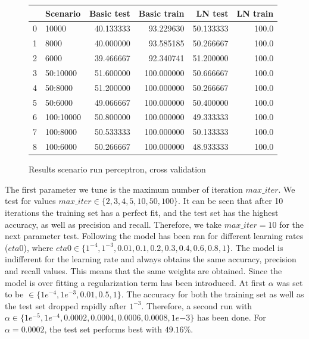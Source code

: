 \documentclass[11pt]{article}
\begin{document}
\begin{figure} 
\begin{tabular}{llrrrr}
\toprule
{} &   Scenario &  Basic test &  Basic train &    LN test &  LN train \\
\midrule
0 &      10000 &   40.133333 &    93.229630 &  50.133333 &     100.0 \\
1 &       8000 &   40.000000 &    93.585185 &  50.266667 &     100.0 \\
2 &       6000 &   39.466667 &    92.340741 &  51.200000 &     100.0 \\
3 &   50:10000 &   51.600000 &   100.000000 &  50.666667 &     100.0 \\
4 &    50:8000 &   51.200000 &   100.000000 &  50.266667 &     100.0 \\
5 &    50:6000 &   49.066667 &   100.000000 &  50.400000 &     100.0 \\
6 &  100:10000 &   50.800000 &   100.000000 &  49.333333 &     100.0 \\
7 &   100:8000 &   50.533333 &   100.000000 &  50.133333 &     100.0 \\
8 &   100:6000 &   50.266667 &   100.000000 &  48.933333 &     100.0 \\
\bottomrule
\end{tabular}
\caption{Results scenario run perceptron, cross validation}
\label{tab:Accuracy perceptron cross validation}
\end{figure}
%
The first parameter we tune is the maximum number of iteration $max\_iter$. We test for values $ max\_iter \in \{2, 3, 4, 5, 10, 50, 100\}$. It can be seen that after 10 iterations the training set has a perfect fit, and the test set has the highest accuracy, as well as precision and recall. Therefore, we take $max\_iter=10$ for the next parameter test.
\newline
Following the model has been ran for different learning rates ($eta0$), where $ eta0 \in \{1^{-4}, 1^{-3}, 0.01, 0.1, 0.2, 0.3, 0.4, 0.6, 0.8, 1\} $. The model is indifferent for the learning rate and always obtains the same accuracy, precision and recall values. This means that the same weights are obtained.
\newline
Since the model is over fitting a regularization term has been introduced. At first $\alpha$ was set to be $ \in \{1e^{-4}, 1e^{-3}, 0.01, 0.5, 1\}$. The accuracy for both the training set as well as the test set dropped rapidly after $1^{-3}$. Therefore, a second run with $\alpha \in  \{1e^{-5}, 1e^{-4}, 0.0002, 0.0004, 0.0006, 0.0008, 1e{-3}\}$ has been done. For $\alpha=0.0002$, the test set performs best with $49.16\%$. 
\end{document}

